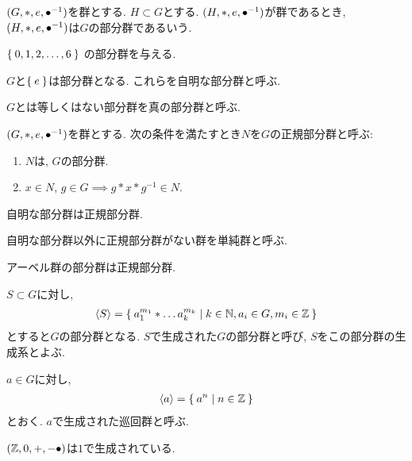 \begin{definition}
  $(G,\ast,e,{\bullet}^{-1})$を群とする.
  $H\subset G$とする.
  $(H,\ast,e,{\bullet}^{-1})$が群であるとき,
  $(H,\ast,e,{\bullet}^{-1})$は$G$の部分群であるいう.
\end{definition}

\begin{example}
  $\Set{0,1,2,\ldots,6}$
  の部分群を与える.
\end{example}

\begin{definition}
  $G$と$\Set{e}$は部分群となる.
  これらを自明な部分群と呼ぶ.

  $G$とは等しくはない部分群を真の部分群と呼ぶ.
\end{definition}

\begin{definition}
  $(G,\ast,e,{\bullet}^{-1})$を群とする.
  次の条件を満たすとき$N$を$G$の正規部分群と呼ぶ:
  \begin{enumerate}
  \item $N$は, $G$の部分群.
  \item $x\in N$, $g\in G \implies g \ast x \ast g^{-1} \in N$.
  \end{enumerate}
\end{definition}
\begin{remark}
  自明な部分群は正規部分群.
\end{remark}
\begin{definition}
  自明な部分群以外に正規部分群がない群を単純群と呼ぶ.
\end{definition}
\begin{remark}
  アーベル群の部分群は正規部分群.
\end{remark}

\begin{definition}
  $S\subset G$に対し,
  \begin{align*}
    \Braket{S}=\Set{a_1^{m_1}\ast \dots a_k^{m_k}|k\in\mathbb{N}, a_i\in G, m_i\in \mathbb{Z}}
  \end{align*}
  とすると$G$の部分群となる.
  $S$で生成された$G$の部分群と呼び, $S$をこの部分群の生成系とよぶ.
\end{definition}
\begin{definition}
  $a\in G$に対し,
  \begin{align*}
    \Braket{a}=\Set{a^n|n\in\mathbb{Z}}
  \end{align*}
  とおく.
  $a$で生成された巡回群と呼ぶ.
\end{definition}

\begin{example}
$(\mathbb{Z},0,+,-{\bullet})$は$1$で生成されている.
\end{example}

